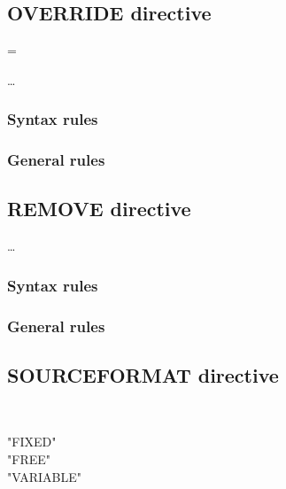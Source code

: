 \subsection{OVERRIDE directive}

\begin{syntax}[\miscextcolour]
  \begin{1=}
    \literal = \literal
  \end{1=} \dots
\end{syntax}

\subsubsection{Syntax rules}

\subsubsection{General rules}

\subsection{REMOVE directive}

\begin{syntax}[\miscextcolour]
   \literal \dots
\end{syntax}

\subsubsection{Syntax rules}

\subsubsection{General rules}

\subsection{SOURCEFORMAT directive}

\begin{syntax}[\miscextcolour]
  \begin{1=}
     \\
  \end{1=}
  \begin{1=}
    "FIXED" \\
    "FREE" \\
    "VARIABLE"
  \end{1=}
\end{syntax}

